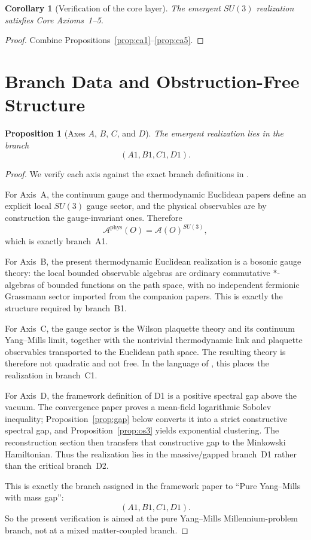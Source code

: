 \documentclass[11pt]{article}
\newtheorem{proposition}[theorem]{Proposition}
\newtheorem{corollary}[theorem]{Corollary}
\theoremstyle{definition}
\theoremstyle{remark}
\newcommand{\mcA}{\mathcal A}
\begin{document}
\begin{corollary}[Verification of the core layer]
\label{cor:core}
The emergent $SU(3)$ realization satisfies Core Axioms~1--5.
\end{corollary}

\begin{proof}
Combine Propositions~\ref{prop:ca1}--\ref{prop:ca5}.
\end{proof}

\section{Branch Data and Obstruction-Free Structure}
\label{sec:branches}

\begin{proposition}[Axes $A$, $B$, $C$, and $D$]
\label{prop:axes}
The emergent realization lies in the branch
\[
(A1,B1,C1,D1).
\]
\end{proposition}

\begin{proof}
We verify each axis against the exact branch definitions in
\cite[Axes A--D]{axioms}.

For Axis~A, the continuum gauge and thermodynamic Euclidean papers define an
explicit local $SU(3)$ gauge sector, and the physical observables
are by construction the gauge-invariant ones.  Therefore
\[
\mcA^{\mathrm{phys}}(O)=\mcA(O)^{SU(3)},
\]
which is exactly branch~A1.

For Axis~B, the present thermodynamic Euclidean realization is a bosonic gauge
theory: the local bounded observable algebras are ordinary commutative
$*$-algebras of bounded functions on the path space, with no independent
fermionic Grassmann sector imported from the companion papers.  This is exactly
the structure required by branch~B1.

For Axis~C, the gauge sector is the Wilson plaquette theory and its continuum
Yang--Mills limit, together with the nontrivial thermodynamic link and
plaquette observables transported to the Euclidean path space.  The resulting
theory is therefore not quadratic and not free.  In the language of
\cite[Axis C]{axioms}, this places the realization in branch~C1.

For Axis~D, the framework definition of D1 is a positive spectral gap above the
vacuum.  The convergence paper proves a mean-field logarithmic Sobolev
inequality; Proposition~\ref{prop:gap} below converts it into a strict
constructive spectral gap, and Proposition~\ref{prop:os3} yields exponential
clustering.  The reconstruction section then transfers that constructive gap to
the Minkowski Hamiltonian.  Thus the realization lies in the massive/gapped
branch~D1 rather than the critical branch~D2.

This is exactly the branch assigned in the framework paper to
``Pure Yang--Mills with mass gap'':
\[
(A1,B1,C1,D1).
\]
So the present verification is aimed at the pure Yang--Mills Millennium-problem
branch, not at a mixed matter-coupled branch.
\end{proof}
\end{document}
